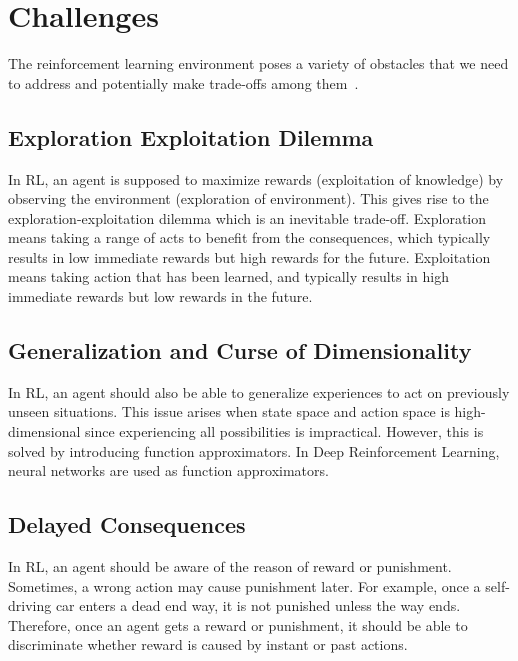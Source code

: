 \section{Challenges}
\label{sec:chal}

The reinforcement learning environment poses a variety of obstacles 
that we need to address and potentially make trade-offs among them~\cite{dulac-arnold_challenges_2019, sutton_reinforcement_1998}.

\subsection{Exploration Exploitation Dilemma}

In RL, an agent is supposed to maximize rewards (exploitation of knowledge) by observing the environment (exploration of environment). 
This gives rise to the exploration-exploitation dilemma which is an inevitable trade-off. 
Exploration means taking a range of acts to benefit from the consequences, which typically results in low immediate rewards but high rewards for the future. 
Exploitation means taking action that has been learned, and typically results in high immediate rewards but low rewards in the future. 

\subsection{Generalization and Curse of Dimensionality}

In RL, an agent should also be able to generalize experiences to act on previously unseen situations. 
This issue arises when state space and action space is high-dimensional since experiencing all possibilities is impractical. 
However, this is solved by introducing function approximators. In Deep Reinforcement Learning, neural networks are used as function approximators. 

\subsection{Delayed Consequences}

In RL, an agent should be aware of the reason of reward or punishment. 
Sometimes, a wrong action may cause punishment later. 
For example, once a self-driving car enters a dead end way, it is not punished unless the way ends. 
Therefore, once an agent gets a reward or punishment, it should be able to discriminate whether reward is caused by instant or past actions. 

